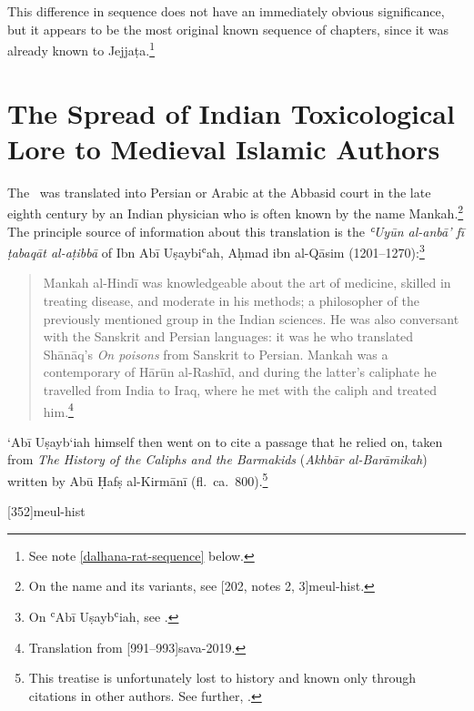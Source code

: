 
\noindent
This difference in sequence does not have an immediately obvious 
significance, but it appears to be the most original known sequence of 
chapters, since it was already known to Jejjaṭa.\footnote{See note 
\ref{dalhana-rat-sequence} below.}

\section{The Spread of Indian Toxicological Lore to Medieval Islamic  
Authors}

The \SS\ was translated into Persian or Arabic at the Abbasid court in
the late eighth century by an Indian physician who is often known by
the name Mankah.\footnote{On the name and its variants, see
    [202, notes 2, 3]{meul-hist}.}  The principle source of
    information about this translation is the 
    \emph{ʿUyūn al-anbā' fī ṭabaqāt al-aṭibbā} of Ibn Abī Uṣaybiʿah, Aḥmad ibn 
    al-Qāsim
    (1201--1270):\footnote{On ʿAbī Uṣaybʿiah, see \cite{hill-2019}.}
\begin{quote}
    Mankah al-Hindī  was knowledgeable about the art of medicine,
skilled in treating disease, and moderate in his methods; a
philosopher of the previously mentioned group in the Indian
sciences. He was also conversant with the Sanskrit and Persian
languages: it was he who translated Shānāq’s \emph{On poisons}
from Sanskrit to Persian. Mankah was a contemporary of Hārūn
al-Rashīd, and during the latter’s caliphate he travelled from
India to Iraq, where he met with the caliph and treated 
him.\footnote{Translation from [991--993]{sava-2019}.}
\end{quote}
`Abī Uṣayb`iah himself then went on to cite a passage that he relied on, taken 
from  
\emph{The History of the Caliphs and the Barmakids}  (\emph{Akhbār 
al-Barāmikah}) written by  Abū Ḥafṣ 
al-Kirmānī (fl.\ ca.\ 800).\footnote{This treatise is unfortunately lost to history and 
known only 
through citations in other authors.   See further, \cite{bosw-1994,blad-2011}.}


[352]{meul-hist}
\cite{lang-2018}

